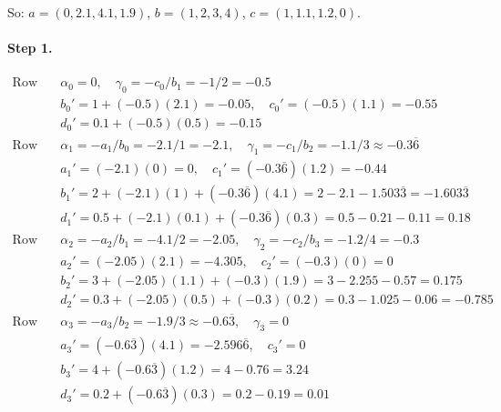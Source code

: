\documentclass[11pt]{article}
\begin{document}
So: $a = (0, 2.1, 4.1, 1.9)$, $b = (1, 2, 3, 4)$, $c = (1, 1.1, 1.2, 0)$.

\paragraph{Step 1.}
\begin{align*}
\text{Row 0:}\quad & \alpha_0 = 0, \quad \gamma_0 = -c_0/b_1 = -1/2 = -0.5 \\
& b_0' = 1 + (-0.5)(2.1) = -0.05, \quad c_0' = (-0.5)(1.1) = -0.55 \\
& d_0' = 0.1 + (-0.5)(0.5) = -0.15 \\[6pt]
\text{Row 1:}\quad & \alpha_1 = -a_1/b_0 = -2.1/1 = -2.1, \quad \gamma_1 = -c_1/b_2 = -1.1/3 \approx -0.3\overline{6} \\
& a_1' = (-2.1)(0) = 0, \quad c_1' = (-0.3\overline{6})(1.2) = -0.44 \\
& b_1' = 2 + (-2.1)(1) + (-0.3\overline{6})(4.1) = 2 - 2.1 - 1.503\overline{3} = -1.603\overline{3} \\
& d_1' = 0.5 + (-2.1)(0.1) + (-0.3\overline{6})(0.3) = 0.5 - 0.21 - 0.11 = 0.18 \\[6pt]
\text{Row 2:}\quad & \alpha_2 = -a_2/b_1 = -4.1/2 = -2.05, \quad \gamma_2 = -c_2/b_3 = -1.2/4 = -0.3 \\
& a_2' = (-2.05)(2.1) = -4.305, \quad c_2' = (-0.3)(0) = 0 \\
& b_2' = 3 + (-2.05)(1.1) + (-0.3)(1.9) = 3 - 2.255 - 0.57 = 0.175 \\
& d_2' = 0.3 + (-2.05)(0.5) + (-0.3)(0.2) = 0.3 - 1.025 - 0.06 = -0.785 \\[6pt]
\text{Row 3:}\quad & \alpha_3 = -a_3/b_2 = -1.9/3 \approx -0.6\overline{3}, \quad \gamma_3 = 0 \\
& a_3' = (-0.6\overline{3})(4.1) = -2.596\overline{6}, \quad c_3' = 0 \\
& b_3' = 4 + (-0.6\overline{3})(1.2) = 4 - 0.76 = 3.24 \\
& d_3' = 0.2 + (-0.6\overline{3})(0.3) = 0.2 - 0.19 = 0.01
\end{align*}
\end{document}
